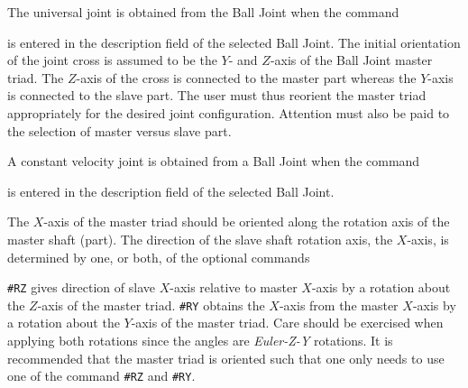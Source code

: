 

The universal joint is obtained from the Ball Joint when the command


\noindent
is entered in the description field of the selected Ball Joint.
The initial orientation of the joint cross is assumed to be the $Y$- and
$Z$-axis of the Ball Joint master triad. The $Z$-axis of the cross is connected
to the master part whereas the $Y$-axis is connected to the slave part.
The user must thus reorient the master triad appropriately for the desired joint
configuration.
Attention must also be paid to the selection of master versus slave part.



A constant velocity joint is obtained from a Ball Joint when the command


\noindent
is entered in the description field of the selected Ball Joint.

The $X$-axis of the master triad should be oriented along the rotation axis of
the master shaft (part). The direction of the slave shaft rotation axis,
the $X$-axis, is determined by one, or both, of the optional commands


\noindent
{\tt\#RZ} gives direction of slave $X$-axis relative to master $X$-axis by a
rotation about the $Z$-axis of the master triad. {\tt\#RY} obtains the $X$-axis
from the master $X$-axis by a rotation about the $Y$-axis of the master triad.
Care should be exercised when applying both rotations since the angles are
{\sl Euler-Z-Y} rotations. It is recommended that the master triad is oriented
such that one only needs to use one of the command {\tt\#RZ} and {\tt\#RY}.


